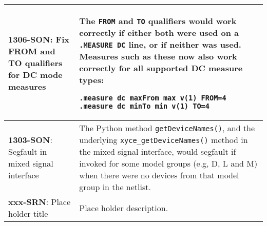 {\begin{longtable}[h] {>{\raggedright\small}m{2in}|>{\raggedright\let\\\tabularnewline\small}m{3.5in}}
\textbf{1306-SON}: Fix FROM and TO qualifiers for DC mode measures &
The \texttt{FROM} and \texttt{TO} qualifiers would work correctly if
either both were used on a \texttt{.MEASURE DC} line, or if neither
was used.  Measures such as these now also work correctly for all
supported DC measure types:
\begin{verbatim}
.measure dc maxFrom max v(1) FROM=4
.measure dc minTo min v(1) TO=4
\end{verbatim}
\\ \hline

\textbf{1303-SON}: Segfault in mixed signal interface &
The Python method \texttt{getDeviceNames()}, and the underlying
\texttt{xyce\_getDeviceNames()} method in the mixed signal interface,
would segfault if invoked for some model groups (e.g, D, L and M) when
there were no devices from that model group in the \Xyce{} netlist.
\\ \hline

\textbf{xxx-SRN}: Place holder title &
Place holder description.  \\ \hline
\end{longtable}
}
